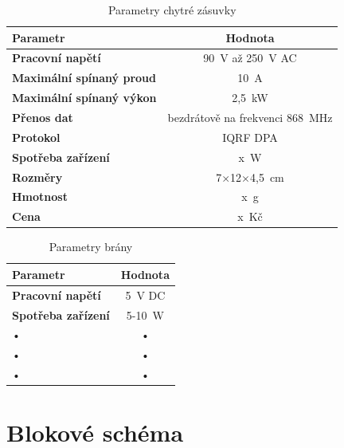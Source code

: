 \documentclass[12pt,a4paper,oneside]{article}
\begin{document}
\begin{table}[H]
	\centering
	\begin{tabular}{|l|c|}
		\hline 
		\textbf{Parametr} & \textbf{Hodnota} \\ 
		\hline 
		\hline 
		\textbf{Pracovní napětí} & 90~V až 250~V AC \\ 
		\hline 
		\textbf{Maximální spínaný proud} & 10~A \\ 
		\hline 
		\textbf{Maximální spínaný výkon} &  2,5~kW \\ 
		\hline 
		\textbf{Přenos dat} & bezdrátově na frekvenci 868~MHz \\ 
		\hline 
		\textbf{Protokol} & IQRF DPA \\ 
		\hline 
		\textbf{Spotřeba zařízení} & x~W \\ 
		\hline 
		\textbf{Rozměry} & 7$\times$12$\times$4,5~cm \\ 
		\hline 
		\textbf{Hmotnost} & x~g \\ 
		\hline 
		\textbf{Cena} & x~Kč \\ 
		\hline 
	\end{tabular}
	\caption{Parametry chytré zásuvky}\label{table:parametry/chytra-zasuvka}
\end{table}

\begin{table}[H]
	\centering
	\begin{tabular}{|l|c|}
		\hline 
		\textbf{Parametr} & \textbf{Hodnota} \\ 
		\hline 
		\hline 
		\textbf{Pracovní napětí} & 5~V DC \\ 
		\hline 
		\textbf{Spotřeba zařízení} & 5-10~W \\ 
		\hline 
		• & • \\ 
		\hline 
		• & • \\ 
		\hline 
		• & • \\ 
		\hline 
	\end{tabular} 
	\caption{Parametry brány}\label{table:parametry/brana}
\end{table}

\section{Blokové schéma}
\end{document}
